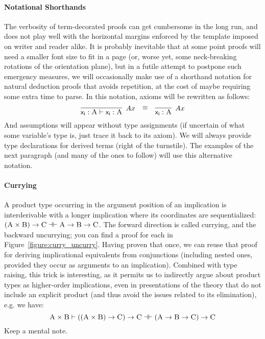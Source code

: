 \paragraph{Notational Shorthands}
The verbosity of term-decorated proofs can get cumbersome in the long run, and does not play well with the horizontal margins enforced by the template imposed on writer and reader alike.
It is probably inevitable that at some point proofs will need a smaller font size to fit in a page (or, worse yet, some neck-breaking rotations of the orientation plane), but in a futile attempt to postpone such emergency measures, we will occasionally make use of a shorthand notation for natural deduction proofs that avoids repetition, at the cost of maybe requiring some extra time to parse.
In this notation, axioms will be rewritten as follows:
\[
\infer[Ax]{\term{x_i}: \prop{A} \vdash \term{x_i}: \prop{A}}{} \quad \raisebox{7pt}{$\equiv$} \quad \infer[Ax]{\term{x_i}:\prop{A}}{}
\]
And assumptions will appear without type assignments (if uncertain of what some variable's type is, just trace it back to its axiom). 
We will always provide type declarations for derived terms (right of the turnstile).
The examples of the next paragraph (and many of the ones to follow) will use this alternative notation.

\paragraph{Currying}
A product type occurring in the argument position of an implication is interderivable with a longer implication where its coordinates are sequentialized: $(\smallprop{A}\times\smallprop{B}) \to \smallprop{C} \dashv \vdash \smallprop{A} \to \smallprop{B} \to \smallprop{C}$.
The forward direction is called currying, and the backward uncurrying; you can find a proof for each in Figure~\ref{figure:curry_uncurry}.
Having proven that once, we can reuse that proof for deriving implicational equivalents from conjunctions (including nested ones, provided they occur as arguments to an implication).
Combined with type raising, this trick is interesting, as it permits us to indirectly argue about product types as higher-order implications, even in presentations of the theory that do not include an explicit product (and thus avoid the issues related to its elimination), e.g. we have:
\[
	\prop{A} \times \prop{B} \vdash ((\prop{A} \times \prop{B}) \to \prop{C}) \to \prop{C} \dashv \vdash (\prop{A} \to \prop{B} \to \prop{C}) \to \prop{C}
\]
Keep a mental note.

